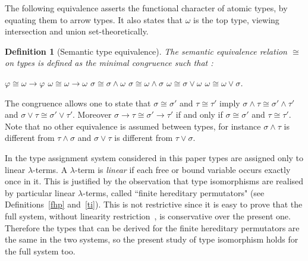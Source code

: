 \documentclass[UKenglish]{eptcs}
\newtheorem{definition}[fact]{Definition}
\newcommand{\tA}{\sigma}       \newcommand{\tB}{\tau}
\newcommand{\tu}{\omega}
\newcommand{\labelx}[1]{\label{#1}}
\newcommand{\myformula}[1]{\\[0.5pt]\centerline{#1}}
\newcommand{\esim}{\cong}
\begin{document}
The following equivalence asserts the functional character of atomic types, by equating them to arrow types.  It also states that $\tu$ is the top type, viewing intersection and union set-theoretically.


\begin{definition}[Semantic type equivalence]\labelx{eq}
The {\em semantic equivalence relation $\esim$ on types} is defined as the minimal congruence such that :
\myformula{$\varphi  \esim \omega \to \varphi$ \qquad
$\omega \esim \omega \to \omega$ \qquad
 $\tA  \esim \tA \wedge \omega$    \qquad    $\tA  \esim \omega \wedge \tA$ \qquad
 $\omega  \esim \tA \vee \omega$    \qquad    $\omega  \esim \omega \vee \tA$.
}\end{definition}
The congruence allows one to state that $\tA \esim \tA'$ and $\tB \esim \tB'$ imply $\tA \wedge \tB  \esim \tA' \wedge \tB'$ and $\tA \vee \tB  \esim \tA' \vee \tB'$. Moreover  $\tA \to \tB  \esim \tA'  \to \tB'$ if and only if $\tA \esim \tA'$ and $\tB \esim \tB'$.  Note that no other equivalence is assumed between types, for instance $\tA \wedge \tB$ is different from $\tB \wedge\tA$ and $\tA \vee \tB$ is different from $\tB \vee\tA$.

\smallskip

In the type assignment system considered in this paper types are assigned only to
 linear $\lambda$-terms. A $\lambda$-term is {\em linear} if each free or bound variable occurs exactly once in it. This is justified by the observation that type isomorphisms are realised by particular linear $\lambda$-terms, called ``finite hereditary permutators" (see Definitions~\ref{fhp} and~\ref{ti}).
This is not restrictive since it is easy to prove that the full system, without linearity restriction~\cite{barba}, is conservative over the present one. Therefore the types that can be derived for the finite hereditary permutators  are the same in the two systems, so the present study of type isomorphism holds for
the full system too.
\end{document}
